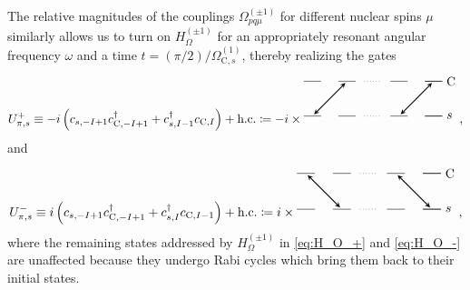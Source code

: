 \documentclass[aps,nofootinbib,notitlepage,11pt]{revtex4-1}
\renewcommand{\t}{\text} %
\newcommand{\p}[1]{\left(#1\right)} %
\newcommand{\C}{\text{C}}
\newcommand{\1}{\mathds{1}}
\begin{document}
The relative magnitudes of the couplings $\Omega_{pq\mu}^{(\pm1)}$ for
different nuclear spins $\mu$ similarly allows us to turn on
$H_\Omega^{(\pm1)}$ for an appropriately resonant angular frequency
$\omega$ and a time $t=\p{\pi/2}/\Omega_{\C,s}^{(1)}$, thereby
realizing the gates
\begin{align}
  U_{\pi,s}^+
  \equiv -i\p{c_{s,-I+1} c_{\C,-I+1}^\dag + c_{s,I-1}^\dag c_{\C,I}}
  + \t{h.c.}
  \coloneqq -i \times
  \begin{tikzpicture}[
    scale=0.5,
    trans/.style={thick,<->,shorten >=2pt,shorten <=2pt,>=stealth}
    ]
    \draw (0,0) -- (1,0);
    \draw (2,0) -- (3,0);
    \draw[dotted] (3.5,0) -- (4.5,0);
    \draw (5,0) -- (6,0);
    \draw (7,0) -- (8,0);
    \draw (7,0) -- (8,0) node[right] {$\C$};
    \draw (0,-2) -- (1,-2);
    \draw (2,-2) -- (3,-2);
    \draw[dotted] (3.5,-2) -- (4.5,-2);
    \draw (5,-2) -- (6,-2);
    \draw (7,-2) -- (8,-2);
    \draw (7,-2) -- (8,-2) node[right] {$s$};
    \draw[trans] (2.5,0) -- (0.5,-2);
    \draw[trans] (7.5,0) -- (5.5,-2);
  \end{tikzpicture},
  \label{eq:U_pi_+}
\end{align}
and
\begin{align}
  U_{\pi,s}^-
  \equiv i\p{c_{s,-I+1} c_{\C,-I+1}^\dag + c_{s,I}^\dag c_{\C,I-1}}
  + \t{h.c.}
  \coloneqq i \times
  \begin{tikzpicture}[
    scale=0.5,
    trans/.style={thick,<->,shorten >=2pt,shorten <=2pt,>=stealth}
    ]
    \draw (0,0) -- (1,0);
    \draw (2,0) -- (3,0);
    \draw[dotted] (3.5,0) -- (4.5,0);
    \draw (5,0) -- (6,0);
    \draw (7,0) -- (8,0);
    \draw (7,0) -- (8,0) node[right] {$\C$};
    \draw (0,-2) -- (1,-2);
    \draw (2,-2) -- (3,-2);
    \draw[dotted] (3.5,-2) -- (4.5,-2);
    \draw (5,-2) -- (6,-2);
    \draw (7,-2) -- (8,-2);
    \draw (7,-2) -- (8,-2) node[right] {$s$};
    \draw[trans] (0.5,0) -- (2.5,-2);
    \draw[trans] (5.5,0) -- (7.5,-2);
  \end{tikzpicture},
  \label{eq:U_pi_-}
\end{align}
where the remaining states addressed by $H_\Omega^{(\pm1)}$ in
\eqref{eq:H_O_+} and \eqref{eq:H_O_-} are unaffected because they
undergo Rabi cycles which bring them back to their initial states.
\end{document}
